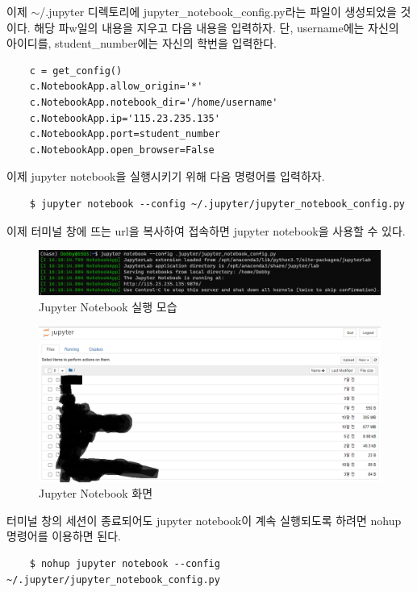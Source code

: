 이제 $\sim$/.jupyter 디렉토리에 jupyter\_notebook\_config.py라는 파일이 생성되었을 것이다. 해당 파w일의 내용을 지우고 다음 내용을 입력하자. 단, username에는 자신의 아이디를, student\_number에는 자신의 학번을 입력한다.
\begin{lstlisting}
    c = get_config()
    c.NotebookApp.allow_origin='*'
    c.NotebookApp.notebook_dir='/home/username'
    c.NotebookApp.ip='115.23.235.135'
    c.NotebookApp.port=student_number
    c.NotebookApp.open_browser=False
\end{lstlisting}
이제 jupyter notebook을 실행시키기 위해 다음 명령어를 입력하자.
\begin{lstlisting}
    $ jupyter notebook --config ~/.jupyter/jupyter_notebook_config.py
\end{lstlisting}
이제 터미널 창에 뜨는 url을 복사하여 접속하면 jupyter notebook을 사용할 수 있다.\\

\begin{figure}[H]
	\begin{center}
        \includegraphics[width=0.6\linewidth]{jupyter_notebook_running}
        \caption{Jupyter Notebook 실행 모습}
    \end{center}
\end{figure}

\begin{figure}[H]
	\begin{center}
        \includegraphics[width=0.8\linewidth]{jupyter_notebook_display}
        \caption{Jupyter Notebook 화면}
    \end{center}
\end{figure}

터미널 창의 세션이 종료되어도 jupyter notebook이 계속 실행되도록 하려면 nohup 명령어를 이용하면 된다.
\begin{lstlisting}
    $ nohup jupyter notebook --config ~/.jupyter/jupyter_notebook_config.py
\end{lstlisting}
